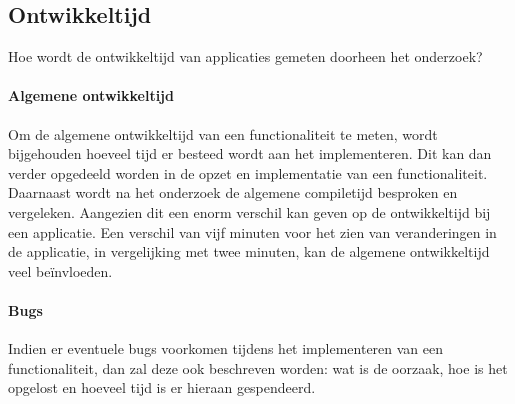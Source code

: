 \subsection{Ontwikkeltijd}
Hoe wordt de ontwikkeltijd van applicaties gemeten doorheen het onderzoek?

\paragraph{Algemene ontwikkeltijd}
Om de algemene ontwikkeltijd van een functionaliteit te meten, wordt bijgehouden 
hoeveel tijd er besteed wordt aan het implementeren. Dit kan dan verder 
opgedeeld worden in de opzet en implementatie van een functionaliteit. 
Daarnaast wordt na het onderzoek de algemene compiletijd besproken en vergeleken. 
Aangezien dit een enorm verschil kan geven op de ontwikkeltijd bij een applicatie. 
Een verschil van vijf minuten voor het zien van veranderingen 
in de applicatie, in vergelijking met twee minuten, kan de algemene 
ontwikkeltijd veel beïnvloeden.

\paragraph{Bugs}
Indien er eventuele bugs voorkomen tijdens het implementeren van een 
functionaliteit, dan zal deze ook beschreven worden: wat is de oorzaak, 
hoe is het opgelost en hoeveel tijd is er hieraan gespendeerd.

